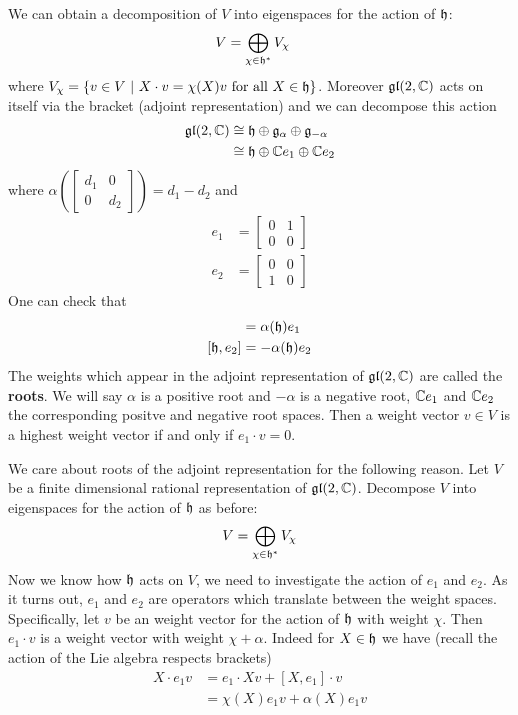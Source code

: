 \documentclass{amsart}
\numberwithin{equation}{section}
\theoremstyle{plain} %
\theoremstyle{definition}
\theoremstyle{remark}
\begin{document}
We can obtain a decomposition of $V$ into eigenspaces for the action of $\mathfrak{h}$: \begin{align*}
    V &= \bigoplus_{\chi\in \mathfrak{h}^*} V_\chi
\end{align*} where $V_\chi = \{v\in V \ \vert \  X\cdot v = \chi(X)v \text{ for all $X\in \mathfrak{h}$}\}$. Moreover
$\operatorname{\mathfrak{gl}}(2,\mathbb{C})$ acts on itself via the bracket (adjoint representation) and we can 
decompose this action \begin{align*}
    \operatorname{\mathfrak{gl}}(2,\mathbb{C}) &\cong \mathfrak{h} \oplus \mathfrak{g}_{\alpha} \oplus \mathfrak{g}_{-\alpha} \\
    &\cong \mathfrak{h} \oplus \mathbb{C} e_1 \oplus \mathbb{C} e_2
\end{align*} where $\alpha(\begin{bmatrix}
    d_1 & 0 \\
    0 & d_2
\end{bmatrix}) = d_1 - d_2$ and \begin{align*}
    e_1 &= \begin{bmatrix}
        0 & 1 \\
        0 & 0
    \end{bmatrix}\\
    e_2 &= \begin{bmatrix}
        0 & 0 \\
        1 & 0
    \end{bmatrix}
\end{align*} One can check that \begin{align*}
    [\mf h, e_1] &= \alpha(\mf h)e_1 \\ [\mf h, e_2] &= -\alpha(\mf h)e_2
\end{align*} The weights which appear in the adjoint representation of $\operatorname{\mathfrak{gl}}(2,\mathbb{C})$ are called the \textbf{roots}.
We will say $\alpha$ is a positive root and $-\alpha$ is a negative root, $\mathbb{C} e_1$ and $\mathbb{C} e_2$ the corresponding positve and negative root spaces.
Then a weight vector $v\in V$ is a highest weight vector if and only if $e_1\cdot v = 0$.

\hfill

We care about roots of the adjoint representation for the following reason. Let $V$ be a finite dimensional rational representation of $\operatorname{\mathfrak{gl}}(2,\mathbb{C})$.
Decompose $V$ into eigenspaces for the action of $\mathfrak{h}$ as before: \begin{align*}
    V = \bigoplus_{\chi \in \mathfrak{h}^*} V_\chi
\end{align*} Now we know how $\mathfrak{h}$ acts on $V$, we need to investigate the action of $e_1$ and $e_2$. As it turns out,
$e_1$ and $e_2$ are operators which translate between the weight spaces. 
Specifically, let $v$ be an weight vector for the action of $\mathfrak{h}$ with weight $\chi$. 
Then $e_1\cdot v$ is a weight vector with weight $\chi + \alpha$. Indeed for $X\in \mathfrak{h}$ we have (recall the action of the Lie algebra respects brackets) 
\begin{align*}
    X\cdot e_1v &= e_1 \cdot Xv + [X,e_1]\cdot v \\
    &= \chi(X)e_1v + \alpha(X)e_1v
\end{align*} 
\end{document}
